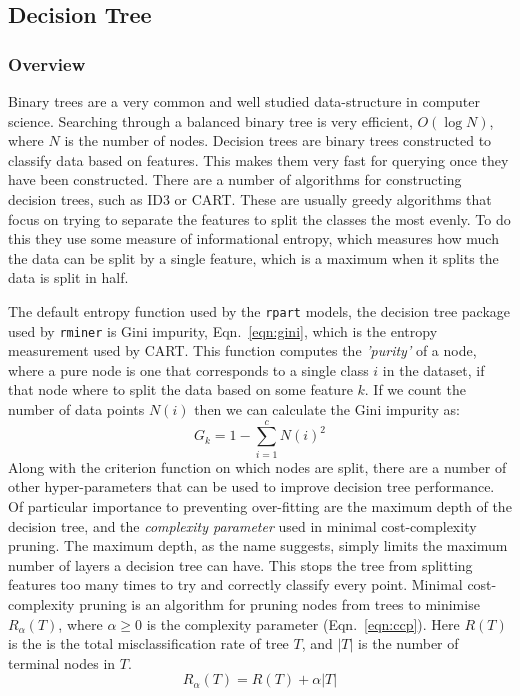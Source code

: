 \documentclass[12pt,a4paper,titlepage,twoside]{report}
\begin{document}
\subsection{Decision Tree}
	
\subsubsection*{Overview}
	Binary trees are a very common and well studied data-structure in computer science. Searching through a balanced binary tree is very efficient, $O(\log N)$, where $N$ is the number of nodes. Decision trees are binary trees constructed to classify data based on features\cite{ml-algorithmic-perspective}. This makes them very fast for querying once they have been constructed. There are a number of algorithms for constructing decision trees, such as ID3\cite{ID3} or CART\cite{CART}. These are usually greedy algorithms that focus on trying to separate the features to split the classes the most evenly. To do this they use some measure of informational entropy, which measures how much the data can be split by a single feature, which is a maximum when it splits the data is split in half\cite{info-entropy}. \par
	The default entropy function used by the \texttt{rpart} models, the decision tree package used by \texttt{rminer} is Gini impurity, Eqn.~\ref{eqn:gini}, which is the entropy measurement used by CART. This function computes the \textit{'purity'} of a node, where a pure node is one that corresponds to a single class $i$ in the dataset, if that node where to split the data based on some feature $k$. If we count the number of data points $N(i)$ then we can calculate the Gini impurity as:
	\begin{equation}
	G_k = 1 - \sum_{i=1}^c N(i)^2
	\label{eqn:gini}
	\end{equation}
	Along with the criterion function on which nodes are split, there are a number of other hyper-parameters that can be used to improve decision tree performance. Of particular importance to preventing over-fitting are the maximum depth of the decision tree, and the \textit{complexity parameter} used in minimal cost-complexity pruning. The maximum depth, as the name suggests, simply limits the maximum number of layers a decision tree can have. This stops the tree from splitting features too many times to try and correctly classify every point. Minimal cost-complexity pruning is an algorithm for pruning nodes from trees to minimise $R_\alpha(T)$, where $\alpha \geq 0$ is the complexity parameter (Eqn.~\ref{eqn:ccp}). Here $R(T)$ is the is the total misclassification rate of tree $T$, and $|T|$ is the number of terminal nodes in $T$.
	\begin{equation}
	R_\alpha(T) = R(T) + \alpha|T|
	\label{eqn:ccp}
	\end{equation}
	
\end{document}
